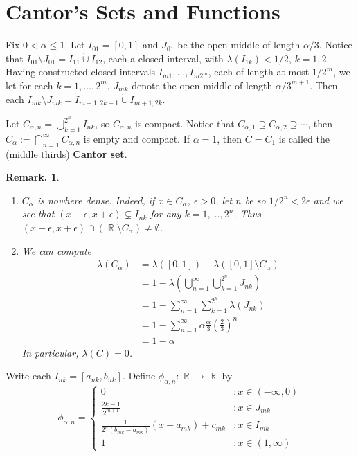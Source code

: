 \documentclass[12pt, a4paper]{memoir}
\DeclareMathOperator{\R}{{\mathbb{R}}}
\theoremstyle{nonumberplain}
\newtheorem{remark}{Remark.}
\begin{document}
\section{Cantor's Sets and Functions}
Fix $0<\alpha\leq 1$.
Let $I_{01}=[0,1]$ and $J_{01}$ be the open middle of length $\alpha/3$.
Notice that $I_{01}\setminus J_{01}=I_{11}\dot{\cup}I_{12}$, each a closed interval, with $\lambda(I_{1k})<1/2$, $k=1,2$.
Having constructed closed intervals $I_{m1},\ldots,I_{m2^m}$, each of length at most $1/2^m$, we let for each $k=1,\ldots,2^m$, $J_{mk}$ denote the open middle of length $\alpha/3^{m+1}$.
Then each $I_{mk}\setminus J_{mk}=I_{m+1,2k-1}\dot{\cup}I_{m+1,2k}$.

Let $C_{\alpha,n}=\bigcup_{k=1}^{2^n}I_{nk}$, so $C_{\alpha,n}$ is compact.
Notice that $C_{\alpha,1}\supseteq C_{\alpha,2}\supseteq\cdots$, then $C_\alpha:=\bigcap_{n=1}^\infty C_{\alpha,n}$ is empty and compact.
If $\alpha=1$, then $C=C_1$ is called the (middle thirds) \textbf{Cantor set}.
\begin{remark}
    \begin{enumerate}
        \item $C_\alpha$ is nowhere dense.
            Indeed, if $x\in C_\alpha$, $\epsilon>0$, let $n$ be so $1/2^n<2\epsilon$ and we see that $(x-\epsilon,x+\epsilon)\subsetneq I_{nk}$ for any $k=1,\ldots,2^n$.
            Thus $(x-\epsilon,x+\epsilon)\cap(\R\setminus C_\alpha)\neq\emptyset$.
        \item We can compute
            \begin{align*}
                \lambda(C_\alpha)&=\lambda([0,1])-\lambda([0,1]\setminus C_\alpha)\\
                                 &= 1-\lambda\left(\bigcup_{n=1}^\infty\bigcup_{k=1}^{2^n}J_{nk}\right)\\
                                 &= 1-\sum\limits_{n=1}^\infty\sum\limits_{k=1}^{2^n}\lambda(J_{nk})\\
                                 &= 1-\sum\limits_{n=1}^\infty \alpha\frac{\alpha}{3}\left(\frac{2}{3}\right)^n\\
                                 &= 1-\alpha
            \end{align*}
            In particular, $\lambda(C)=0$.
    \end{enumerate}
\end{remark}
Write each $I_{nk}=[a_{nk},b_{nk}]$.
Define $\phi_{\alpha,n}:\R\to\R$ by
\begin{equation*}
    \phi_{\alpha,n}=\begin{cases}
        0 &: x\in(-\infty,0)\\
        \frac{2k-1}{2^{m+1}} &: x\in J_{mk}\\
        \frac{1}{2^n(b_{mk}-a_{mk})}(x-a_{mk})+c_{mk} &: x\in I_{mk}\\
        1 &: x\in(1,\infty)
    \end{cases}
\end{equation*}
\end{document}
